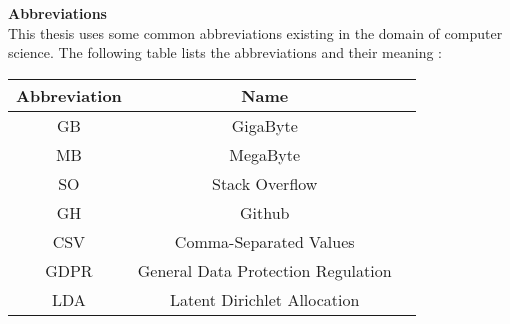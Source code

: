 \begin{center}
{\Large\bf Abbreviations}\\
This thesis uses some common abbreviations existing in the domain of computer science. The following table lists the abbreviations and their meaning :\\ \vspace{12pt}
\begin{tabular}{ccc}
  \hline
  Abbreviation & Name  \\
  \hline\hline
  GB & GigaByte \\ 
  MB & MegaByte \\
  SO & Stack Overflow \\
  GH & Github \\
  CSV & Comma-Separated Values \\
  GDPR & General Data Protection Regulation \\
  LDA & Latent Dirichlet Allocation \\
  \hline
\end{tabular}
\end{center}
